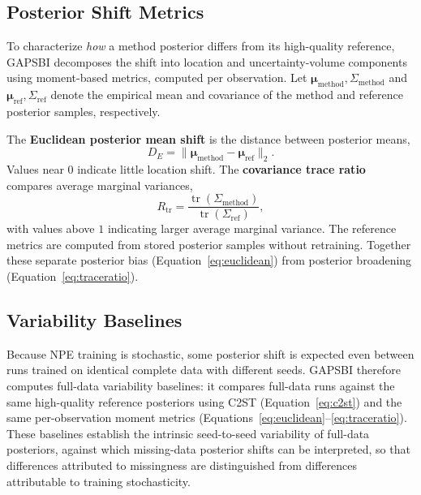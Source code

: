 \documentclass{article} %
\begin{document}
\subsection{Posterior Shift Metrics}
\label{sec:eval-shift}

To characterize \emph{how} a method posterior differs from its high-quality
reference, GAPSBI decomposes the shift into location and uncertainty-volume
components using moment-based metrics, computed per observation. Let
$\boldsymbol{\mu}_{\mathrm{method}}, \Sigma_{\mathrm{method}}$ and
$\boldsymbol{\mu}_{\mathrm{ref}}, \Sigma_{\mathrm{ref}}$ denote the empirical
mean and covariance of the method and reference posterior samples,
respectively.

The \textbf{Euclidean posterior mean shift} is the distance between posterior
means,
\begin{equation}
  D_E = \lVert \boldsymbol{\mu}_{\mathrm{method}} - \boldsymbol{\mu}_{\mathrm{ref}} \rVert_2 .
  \label{eq:euclidean}
\end{equation}
Values near $0$ indicate little location shift. The \textbf{covariance trace
ratio} compares average marginal variances,
\begin{equation}
  R_{\mathrm{tr}} =
  \frac{\operatorname{tr}(\Sigma_{\mathrm{method}})}{\operatorname{tr}(\Sigma_{\mathrm{ref}})},
  \label{eq:traceratio}
\end{equation}
with values above $1$ indicating larger average marginal variance. The
reference metrics are computed from stored posterior samples without retraining.
Together these separate posterior bias (Equation~\eqref{eq:euclidean}) from
posterior broadening (Equation~\eqref{eq:traceratio}).

\subsection{Variability Baselines}
\label{sec:eval-variability}

Because NPE training is stochastic, some posterior shift is expected even between
runs trained on identical complete data with different seeds. GAPSBI therefore
computes full-data variability baselines: it compares full-data runs against the
same high-quality reference posteriors using C2ST (Equation~\eqref{eq:c2st}) and
the same per-observation moment metrics
(Equations~\eqref{eq:euclidean}--\eqref{eq:traceratio}).
These baselines establish the
intrinsic seed-to-seed variability of full-data posteriors, against which
missing-data posterior shifts can be interpreted, so that differences attributed
to missingness are distinguished from differences attributable to training
stochasticity.
\end{document}
